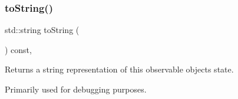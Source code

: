 \subsubsection{\texorpdfstring{to\+String()}{toString()}}
{\footnotesize\ttfamily std\+::string to\+String (\begin{DoxyParamCaption}{ }\end{DoxyParamCaption}) const\hspace{0.3cm}{\ttfamily [virtual]}, {\ttfamily [inherited]}}



Returns a string representation of this observable object\textquotesingle{}s state. 

Primarily used for debugging purposes. 